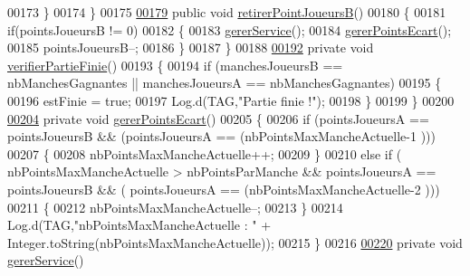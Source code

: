 \begin{DoxyCode}
00173         \}
00174     \}
00175 
\hyperlink{classcom_1_1example_1_1area_1_1_partie_aa3f7d2c68dcf31a2e48f95c5db9c5663}{00179}     \textcolor{keyword}{public} \textcolor{keywordtype}{void} \hyperlink{classcom_1_1example_1_1area_1_1_partie_aa3f7d2c68dcf31a2e48f95c5db9c5663}{retirerPointJoueursB}()
00180     \{
00181         \textcolor{keywordflow}{if}(pointsJoueursB != 0)
00182         \{
00183             \hyperlink{classcom_1_1example_1_1area_1_1_partie_a52c8e133b23468d4b2c4338a80c3763c}{gererService}();
00184             \hyperlink{classcom_1_1example_1_1area_1_1_partie_a2838da99f206d736a22f8a3f271365b2}{gererPointsEcart}();
00185             pointsJoueursB--;
00186         \}
00187     \}
00188 
\hyperlink{classcom_1_1example_1_1area_1_1_partie_ad07c65c2ba36cd08798cee1ba6b99c81}{00192}     \textcolor{keyword}{private} \textcolor{keywordtype}{void} \hyperlink{classcom_1_1example_1_1area_1_1_partie_ad07c65c2ba36cd08798cee1ba6b99c81}{verifierPartieFinie}()
00193     \{
00194         \textcolor{keywordflow}{if} (manchesJoueursB == nbManchesGagnantes || manchesJoueursA == nbManchesGagnantes)
00195         \{
00196             estFinie = \textcolor{keyword}{true};
00197             Log.d(TAG,\textcolor{stringliteral}{"Partie finie !"});
00198         \}
00199     \}
00200 
\hyperlink{classcom_1_1example_1_1area_1_1_partie_a2838da99f206d736a22f8a3f271365b2}{00204}     \textcolor{keyword}{private} \textcolor{keywordtype}{void} \hyperlink{classcom_1_1example_1_1area_1_1_partie_a2838da99f206d736a22f8a3f271365b2}{gererPointsEcart}()
00205     \{
00206         \textcolor{keywordflow}{if} (pointsJoueursA == pointsJoueursB && (pointsJoueursA == (nbPointsMaxMancheActuelle-1 )))
00207         \{
00208             nbPointsMaxMancheActuelle++;
00209         \}
00210         \textcolor{keywordflow}{else} \textcolor{keywordflow}{if} ( nbPointsMaxMancheActuelle > nbPointsParManche && pointsJoueursA == pointsJoueursB && (
      pointsJoueursA == (nbPointsMaxMancheActuelle-2 )))
00211         \{
00212             nbPointsMaxMancheActuelle--;
00213         \}
00214         Log.d(TAG,\textcolor{stringliteral}{"nbPointsMaxMancheActuelle : "} + Integer.toString(nbPointsMaxMancheActuelle));
00215     \}
00216 
\hyperlink{classcom_1_1example_1_1area_1_1_partie_a52c8e133b23468d4b2c4338a80c3763c}{00220}     \textcolor{keyword}{private} \textcolor{keywordtype}{void} \hyperlink{classcom_1_1example_1_1area_1_1_partie_a52c8e133b23468d4b2c4338a80c3763c}{gererService}()

\end{DoxyCode}
